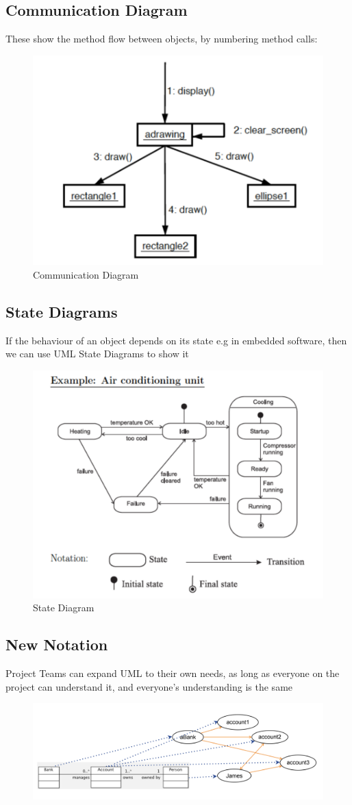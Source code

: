 \documentclass{article}
\begin{document}
\subsection{Communication Diagram}
These show the method flow between objects, by numbering method calls:
\begin{figure}[H]
\centering
\includegraphics[width = 0.5\linewidth]{Pictures/Screenshot 2023-01-27 at 12.51.42.png}
\caption{Communication Diagram}
\end{figure}
\subsection{State Diagrams}
If the behaviour of an object depends on its state e.g in embedded software, then we can use UML State Diagrams to show it
\begin{figure}[H]
\centering
\includegraphics[width = 0.5\linewidth]{Pictures/Screenshot 2023-01-27 at 12.52.49.png}
\caption{State Diagram}
\end{figure}
\subsection{New Notation}
Project Teams can expand UML to their own needs, as long as everyone on the project can understand it, and everyone's understanding is the same
\begin{figure}[H]
\centering
\includegraphics[width = 0.6\linewidth]{Pictures/Screenshot 2023-01-27 at 12.54.30.png}
\end{figure}
\end{document}
